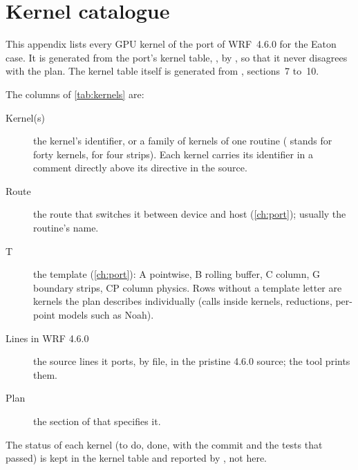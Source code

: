 \chapter{Kernel catalogue}\label{app:kernels}

This appendix lists every GPU kernel of the port of WRF~4.6.0 for the Eaton case. It is generated from the port's
kernel table, , by , so that it never disagrees with the
plan. The kernel table itself is generated from , sections~7 to~10.

The columns of \cref{tab:kernels} are:
\begin{description}
  \item[Kernel(s)] the kernel's identifier, or a family of kernels of one routine ( stands for
    forty kernels,  for four strips). Each kernel carries its identifier in a comment directly
    above its directive in the source.
  \item[Route] the route that switches it between device and host (\cref{ch:port}); usually the routine's name.
  \item[T] the template (\cref{ch:port}): A pointwise, B rolling buffer, C column, G boundary strips, CP column
    physics. Rows without a template letter are kernels the plan describes individually (calls inside kernels,
    reductions, per-point models such as Noah).
  \item[Lines in WRF 4.6.0] the source lines it ports, by file, in the pristine 4.6.0 source; the tool
     prints them.
  \item[Plan] the section of  that specifies it.
\end{description}
The status of each kernel (to do, done, with the commit and the tests that passed) is kept in the kernel table and
reported by , not here.



